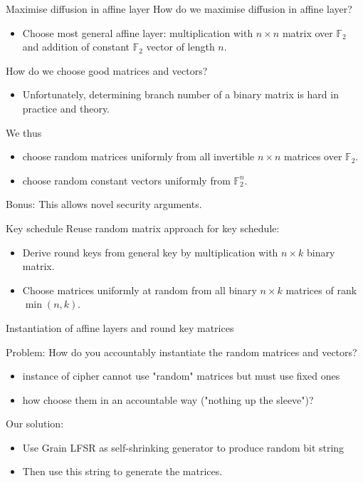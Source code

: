 \documentclass[10pt,compress]{beamer}
\newcommand{\F}{\mathbb{F}}
\begin{document}
\begin{frame}{Maximise diffusion in affine layer}
How do we maximise diffusion in affine layer?
\begin{itemize}
\item \alert{Choose most general affine layer}: multiplication with $n\times n$ matrix over $\F_2$ and addition of constant $\F_2$ vector of length $n$.
\end{itemize}
How do we choose good matrices and vectors?
\begin{itemize}
\item Unfortunately, determining branch number of a binary matrix is hard in practice and theory.
\end{itemize}
We thus
\begin{itemize}
\item \alert{choose random matrices} uniformly from all invertible $n\times n$ matrices over $\F_2$.
\item \alert{choose random constant vectors} uniformly from $\F_2^n$.
\end{itemize}
\alert{Bonus:} This allows novel security arguments.
\end{frame}

\begin{frame}{Key schedule}
Reuse random matrix approach for key schedule:
\begin{itemize}
\item Derive round keys from general key by multiplication with $n\times k$ binary matrix.
 \item Choose matrices uniformly at random from all binary $n\times k$
   matrices of rank $\min(n,k)$.
\end{itemize}
\end{frame}

\begin{frame}{Instantiation of affine layers and round key matrices}
\begin{alertblock}{Problem: How do you accountably instantiate the random matrices and vectors?}
\begin{itemize}
  \item instance of cipher cannot use "random" matrices but must use fixed ones
  \item how choose them in an accountable way ("nothing up the sleeve")?
\end{itemize}
\end{alertblock}
Our solution:
\begin{itemize}
 \item \alert{Use Grain LFSR as self-shrinking generator} to produce random bit string
 \item Then use this string to generate the matrices.
\end{itemize}
\end{frame}
\end{document}
